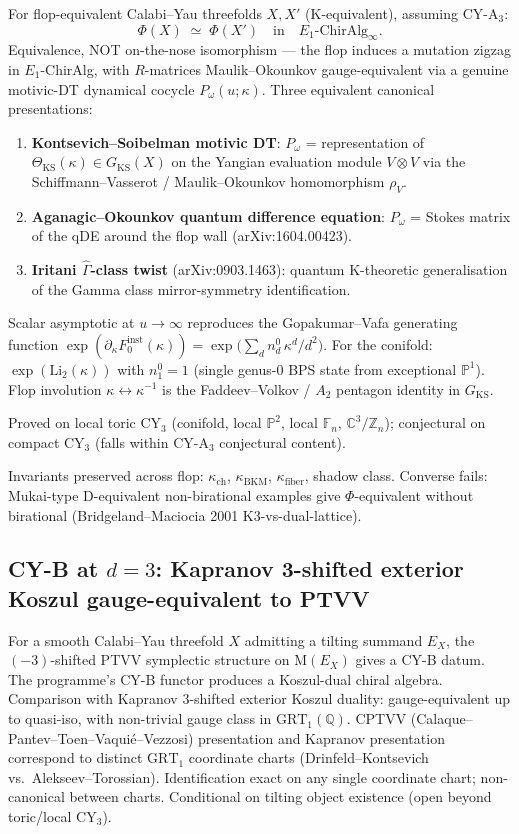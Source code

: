 \documentclass[11pt]{article}
\begin{document}
For flop-equivalent Calabi--Yau threefolds $X, X'$ (K-equivalent),
assuming CY-A$_3$:
\[
  \Phi(X) \;\simeq\; \Phi(X')
  \quad
  \text{in}
  \quad
  E_1\text{-}\mathrm{ChirAlg}_{\infty}.
\]
Equivalence, NOT on-the-nose isomorphism --- the flop induces a
mutation zigzag in $E_1$-ChirAlg, with $R$-matrices Maulik--Okounkov
gauge-equivalent via a genuine motivic-DT dynamical cocycle
$P_{\omega}(u; \kappa)$. Three equivalent canonical presentations:
\begin{enumerate}
\item \textbf{Kontsevich--Soibelman motivic DT}: $P_{\omega}$ =
representation of $\Theta_{\mathrm{KS}}(\kappa) \in G_{\mathrm{KS}}(X)$
on the Yangian evaluation module $V \otimes V$ via the
Schiffmann--Vasserot / Maulik--Okounkov homomorphism $\rho_V$.
\item \textbf{Aganagic--Okounkov quantum difference equation}:
$P_{\omega}$ = Stokes matrix of the qDE around the flop wall
(arXiv:1604.00423).
\item \textbf{Iritani $\widehat{\Gamma}$-class twist}
(arXiv:0903.1463): quantum K-theoretic generalisation of the Gamma
class mirror-symmetry identification.
\end{enumerate}
Scalar asymptotic at $u \to \infty$ reproduces the Gopakumar--Vafa
generating function
$\exp(\partial_{\kappa} F_0^{\mathrm{inst}}(\kappa))
= \exp\bigl(\sum_d n_d^0\,\kappa^d / d^2\bigr)$. For the
conifold: $\exp(\mathrm{Li}_2(\kappa))$ with
$n_1^0 = 1$ (single genus-0 BPS state from exceptional $\mathbb{P}^1$).
Flop involution $\kappa \leftrightarrow \kappa^{-1}$ is the
Faddeev--Volkov / $A_2$ pentagon identity in $G_{\mathrm{KS}}$.

Proved on local toric CY$_3$ (conifold, local $\mathbb{P}^2$, local
$\mathbb{F}_n$, $\mathbb{C}^3/\mathbb{Z}_n$); conjectural on compact
CY$_3$ (falls within CY-A$_3$ conjectural content).

Invariants preserved across flop: $\kappa_{\mathrm{ch}}$,
$\kappa_{\mathrm{BKM}}$, $\kappa_{\mathrm{fiber}}$, shadow class.
Converse fails: Mukai-type D-equivalent non-birational examples
give $\Phi$-equivalent without birational (Bridgeland--Maciocia 2001
K3-vs-dual-lattice).

\subsection{CY-B at $d = 3$: Kapranov 3-shifted exterior Koszul
gauge-equivalent to PTVV}

For a smooth Calabi--Yau threefold $X$ admitting a tilting summand
$E_X$, the $(-3)$-shifted PTVV symplectic structure on
$\mathrm{M}(E_X)$ gives a CY-B datum. The programme's CY-B functor
produces a Koszul-dual chiral algebra. Comparison with Kapranov
$3$-shifted exterior Koszul duality: gauge-equivalent up to
quasi-iso, with non-trivial gauge class in $\mathrm{GRT}_1(\mathbb{Q})$.
CPTVV (Calaque--Pantev--Toen--Vaquié--Vezzosi) presentation and
Kapranov presentation correspond to distinct $\mathrm{GRT}_1$
coordinate charts (Drinfeld--Kontsevich vs.\ Alekseev--Torossian).
Identification exact on any single coordinate chart; non-canonical
between charts. Conditional on tilting object existence (open
beyond toric/local CY$_3$).
\end{document}
